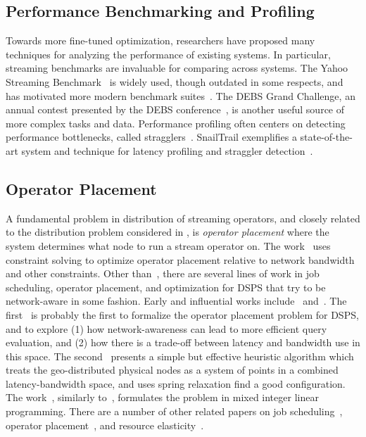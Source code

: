 \subsection{Performance Benchmarking and Profiling}

Towards more fine-tuned optimization, researchers have proposed many techniques for analyzing the performance of existing systems.
In particular, streaming benchmarks are invaluable for comparing across systems.
The Yahoo Streaming Benchmark~\cite{yahoostreaming2016} is widely used,
though outdated in some respects, and has motivated more modern benchmark suites~\cite{bordin2020dspbench,lopez2016performance}.
The DEBS Grand Challenge, an annual contest presented by the DEBS conference~\cite{DEBS2006}, is another useful source of more complex tasks and data.
Performance profiling often centers on detecting performance bottlenecks, called stragglers~\cite{liu2020resource,khan2015empirical}.
SnailTrail exemplifies a state-of-the-art system and technique for latency profiling and straggler detection~\cite{hoffmann2018snailtrail}.

\subsection{Operator Placement}

A fundamental problem in distribution of streaming operators, and closely related to the distribution problem considered in ,
is \emph{operator placement} where the system determines what node to run a stream operator on.
The work~\cite{cardellini2016optimal} uses constraint solving to optimize operator placement relative to network bandwidth and other constraints.
Other than~\cite{cardellini2016optimal}, there are several lines of work in job scheduling, operator placement, and optimization for DSPS that try to be network-aware in some fashion. Early and influential works include~\cite{ahmad2004network} and~\cite{pietzuch2006network}.
The first~\cite{ahmad2004network} is probably the first to formalize the operator placement problem for DSPS, and to explore (1) how network-awareness can lead to more efficient query evaluation, and (2) how there is a trade-off between latency and bandwidth use in this space.
The second~\cite{pietzuch2006network} presents a simple but effective heuristic algorithm which treats the geo-distributed physical nodes as a system of points in a combined latency-bandwidth space, and uses spring relaxation find a good configuration.
The work~\cite{gu2015general}, similarly to~\cite{cardellini2016optimal}, formulates the problem in mixed integer linear programming.
There are a number of other related papers on job scheduling~\cite{aniello2013adaptive,xu2014tstorm,eidenbenz2016task,wolf2008soda,fu2019edgewise}, operator placement~\cite{bonfils2004adaptive,tziritas2016improving,rizou2010solving,lakshmanan2008placement},
and resource elasticity~\cite{cardellini2018decentralized,hochreiner2016elastic,cardellini2018optimal,dias2018dsp-survey}.

